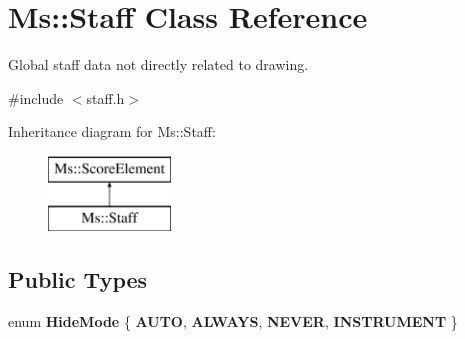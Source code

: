 \hypertarget{class_ms_1_1_staff}{}\section{Ms\+:\+:Staff Class Reference}
\label{class_ms_1_1_staff}


Global staff data not directly related to drawing.  




{\ttfamily \#include $<$staff.\+h$>$}

Inheritance diagram for Ms\+:\+:Staff\+:\begin{figure}[H]
\begin{center}
\leavevmode
\includegraphics[height=2.000000cm]{class_ms_1_1_staff}
\end{center}
\end{figure}
\subsection*{Public Types}
\begin{DoxyCompactItemize}
\item 
\mbox{\label{class_ms_1_1_staff_a693ed2bc02f09dc0fff3f6731dfa3e98}} 
enum {\bfseries Hide\+Mode} \{ {\bfseries A\+U\+TO}, 
{\bfseries A\+L\+W\+A\+YS}, 
{\bfseries N\+E\+V\+ER}, 
{\bfseries I\+N\+S\+T\+R\+U\+M\+E\+NT}
 \}
\end{DoxyCompactItemize}
